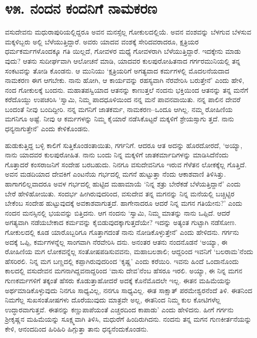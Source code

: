 
\chapter{೪೫. ನಂದನ ಕಂದನಿಗೆ ನಾಮಕರಣ}

ವಸುದೇವನು ಮಧುರಾಪುರಿಯಲ್ಲಿದ್ದರೂ ಅವನ ಮನಸ್ಸೆಲ್ಲ ಗೋಕುಲದಲ್ಲಿಯೆ. ಅವನ ವಂಶವನ್ನು ಬೆಳಗುವ ಬೆಳಸುವ ಮಕ್ಕಳಿಬ್ಬರು ಅಲ್ಲಿ ಬೆಳೆಯುತ್ತಿದ್ದಾರೆ. ಅವರು ಯಾದವ ವಂಶಕ್ಕೆ ಸೇರಿದವರಾದರೂ, ಕ್ಷತ್ರಿಯರ ಧರ್ಮಕರ್ಮಗಳೊಂದಕ್ಕೂ ಗತಿ ಯಿಲ್ಲದೆ, ಗೋವಳರ ಮಧ್ಯೆ ಗೋವಳರಾಗಿ ಬೆಳೆಯುತ್ತಿದ್ದಾರೆ. ಇದಕ್ಕೇನು ಮಾಡು ವುದು? ಆತನು ಸುದೀರ್ಘವಾಗಿ ಆಲೋಚನೆ ಮಾಡಿ, ಯಾದವರ ಕುಲಪುರೋಹಿತನಾದ ಗರ್ಗರಮುನಿಯಲ್ಲಿ ತನ್ನ ಸಂಕಟವನ್ನು ತೋಡಿ ಕೊಂಡನು. ಆ ಮುನಿಯು ‘ಕ್ಷತ್ರಿಯರಿಗೆ ಅಗತ್ಯವಾದ ಕರ್ಮಗಳಲ್ಲಿ ಮೊದಲನೆಯದಾದ ನಾಮಕರಣ ಈಗ ಆಗಬೇಕು. ನಾನು ಹೋಗಿ, ಆ ಕಾರ್ಯವನ್ನು ರಹಸ್ಯವಾಗಿ ನೆರವೇರಿಸಿ ಬರುತ್ತೇನೆ’ ಎಂದು ಹೇಳಿ, ನಂದ ಗೋಕುಲಕ್ಕೆ ಬಂದನು. ಮಹಾತಪಸ್ವಿಯಾದ ಆತನನ್ನು ಕಾಣುತ್ತಲೆ ನಂದನು ಭಕ್ತಿಯಿಂದ ಆತನನ್ನು ತನ್ನ ಮನೆಗೆ ಕರೆದೊಯ್ದು ಉಪಚರಿಸಿ ‘ಸ್ವಾಮಿ, ನಿಮ್ಮ ಪಾದಧೂಳಿಯಿಂದ ನನ್ನ ಮನೆ ಪಾವನವಾಯಿತು. ನನ್ನ ಪಾಲಿನ ದೇವರೆ ಬಂದಂತೆ ನೀವು ಬಂದಿದ್ದೀರಿ. ನನ್ನ ಮಗನಿಗೆ ಜಾತಕರ್ಮ, ನಾಮಕರಣ–ಒಂದೂ ಆಗಿಲ್ಲ. ನಮ್ಮ ರೋಹಿಣಿಯ ಮಗನಿಗೂ ಅಷ್ಟೆ. ನೀವು ಆ ಕರ್ಮಗಳನ್ನು ನಿಮ್ಮ ಕೈಯಾರೆ ನಡೆಸಿಕೊಟ್ಟರೆ ಮಕ್ಕಳಿಗೆ ಶ್ರೇಯಸ್ಸಾಗು ತ್ತದೆ. ನಾನು ಧನ್ಯನಾಗುತ್ತೇನೆ’ ಎಂದು ಕೇಳಿಕೊಂಡನು.

ಹುಡುಕುತ್ತಿದ್ದ ಬಳ್ಳಿ ಕಾಲಿಗೆ ಸುತ್ತಿಕೊಂಡಂತಾಯಿತು, ಗರ್ಗನಿಗೆ. ಆದರೂ ಆತ ಅದನ್ನು ಹೊರದೋರದೆ, ‘ಅಯ್ಯಾ, ನಾನು ಯಾದವರ ಕುಲಪುರೋಹಿತ. ನಾನು ಬಂದು ನಿನ್ನ ಮಕ್ಕಳಿಗೆ ಜಾತಕರ್ಮಾದಿಗಳನ್ನು ಮಾಡಿಸಿದೆನೆಂದು ಗೊತ್ತಾದರೆ ಕಂಸರಾಜನಿಗೆ ಸಂದೇಹ ಬರಬಹುದು. ನಿನಗೂ ವಸುದೇವನಿಗೂ ಇರುವ ಗೆಳೆತನ ಲೋಕಕ್ಕೆಲ್ಲ ಗೊತ್ತಿದೆ. ಅವನ ಮಡದಿಯಾದ ದೇವಕಿಗೆ ಎಂಟನೆಯ ಗರ್ಭದಲ್ಲಿ ಮಗನೆ ಹುಟ್ಟುತ್ತಾ ನೆಂದು ಆಕಾಶವಾಣಿ ತಿಳಿಸಿತ್ತು. ಹಾಗಾಗಲಿಲ್ಲವಾದರೂ ಅವಳ ಗರ್ಭದಲ್ಲಿ ಹುಟ್ಟಿದ ಮಹಾಮಾಯೆ ‘ನಿನ್ನ ಶತ್ರು ಬೇರೆಕಡೆ ಬೆಳೆಯತ್ತಿದ್ದಾನೆ’ ಎಂದು ಬೇರೆ ಹೇಳಿಹೋಯಿತು. ಸಂದರ್ಭ ಹೀಗಿರುವುದರಿಂದ, ವಸುದೇವ ತನ್ನ ಮಗನನ್ನು ನಿನ್ನ ಮನೆಯಲ್ಲಿ ಬಚ್ಚಿಟ್ಟಿರ ಬೇಕೆಂಬ ಸಂದೇಹ ಹುಟ್ಟುವುದಕ್ಕೆ ಅವಕಾಶವಾಗುತ್ತದೆ. ಹಾಗೇನಾದರೂ ಆದರೆ ನಿನ್ನ ಮಗನ ಗತಿಯೇನು?’ ಎಂದು ನಂದನ ಮನಸ್ಸಿನಲ್ಲಿ ಭಯವನ್ನು ಬಿತ್ತಿದನು. ಆಗ ನಂದನು ‘ಸ್ವಾಮಿ, ನಿಮ್ಮ ಮಾತನ್ನು ನಾನು ಒಪ್ಪಿದೆ. ಆದರೆ ಅಗತ್ಯವಾಗಿ ನಡೆಯಬೇಕಾದ ಕರ್ಮವನ್ನು ಕೈಬಿಡುವುದಕ್ಕಾಗುತ್ತದೆಯೇ? ಇದನ್ನು ಅತ್ಯಂತ ಗುಟ್ಟಾಗಿ ನಡೆಸೋಣ. ಗೋಕುಲದಲ್ಲಿ ಕೂಡ ಯಾರೊಬ್ಬರಿಗೂ ಗೊತ್ತಾಗದಂತೆ ನಾನು ನೋಡಿಕೊಳ್ಳುತ್ತೇನೆ’ ಎಂದು ಹೇಳಿದನು. ಗರ್ಗನು ಅದಕ್ಕೆ ಒಪ್ಪಿ, ಕರ್ಮಗಳನ್ನೆಲ್ಲ ಸಾಂಗವಾಗಿ ನೆರವೇರಿಸಿ ದನು. ಅನಂತರ ಆತನು ನಂದನೊಡನೆ ‘ಅಯ್ಯಾ, ಈ ರೋಹಿಣಿಯ ಮಗ ಲೋಕವನ್ನೆಲ್ಲ ಸಂತೋಷಪಡಿಸುವವನು, ಮಹಾಬಲಶಾಲಿ; ಆದ್ದರಿಂದ ಇವನಿಗೆ ‘ಬಲರಾಮ’ನೆಂದು ಹೆಸರಿರಲಿ. ನಿನ್ನ ಮಗ ಬಣ್ಣದಲ್ಲಿ ಕಪ್ಪಾಗಿರುವುದರಿಂದ ‘ಕೃಷ್ಣ’ ಎಂದು ಕರೆಯಿರಿ. ಇವನು ಹಿಂದೆ ಒಂದಾನೊಂದು ಕಾಲದಲ್ಲಿ ವಸುದೇವನ ಮಗನಾಗಿದ್ದವನಾದ್ದರಿಂದ ‘ವಾಸು ದೇವ’ನೆಂಬ ಹೆಸರೂ ಇರಲಿ. ಅಯ್ಯಾ, ಈ ನಿನ್ನ ಮಗನ ಗುಣಕರ್ಮಗಳಿಗೆ ತಕ್ಕಂತೆ ಹೆಸರು ಕೊಡುತ್ತಾಹೋದರೆ ಅದಕ್ಕೆ ಕೊನೆಮೊದಲೇ ಇಲ್ಲ. ಈತನ ಮಹಿಮೆಯನ್ನು ಅರ್ಥಮಾಡಿಕೊಳ್ಳುವುದು ನಿನಗೂ ಸಾಧ್ಯವಿಲ್ಲ, ನನಗೂ ಸಾಧ್ಯವಿಲ್ಲ. ಈತ ಸಾಕ್ಷಾತ್ ಪರಮೇಶ್ವರನೆಂದೆ ತಿಳಿ. ಈತನಿಂದ ನಿಮಗೆಲ್ಲ ಸುಖಸಂತೋಷಗಳು ದೊರೆಯುವುದು ಮಾತ್ರವೇ ಅಲ್ಲ, ಈತನಿಂದ ನಿಮ್ಮ ಕುಲ ಕೋಟಿಗಳೆಲ್ಲ ಉದ್ಧಾರವಾಗುತ್ತವೆ. ಈತನನ್ನು ಕಣ್ಣುಪಾಪೆಯಂತೆ ಎಚ್ಚರದಿಂದ ಕಾಪಾಡು’ ಎಂದು ಹೇಳಿದನು. ಹೀಗೆ ಗರ್ಗನು ಶ್ರೀಕೃಷ್ಣನ ಮಹಿಮೆಯನ್ನು ಸೂಕ್ಷ್ಮವಾಗಿ ತಿಳಿಸಿ, ಮಧುರೆಗೆ ಹಿಂದಿರುಗಿದನು. ನಂದನು ತನ್ನ ಮಗನ ಗುಣಕೀರ್ತನೆಯನ್ನು ಕೇಳಿ, ಆನಂದದಿಂದ ಹಿರಿಹಿರಿ ಹಿಗ್ಗುತ್ತಾ ತಾನು ಧನ್ಯನೆಂದುಕೊಂಡನು.

